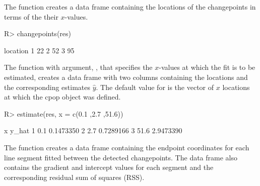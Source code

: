 \documentclass[article]{jss}
\begin{document}
The function 
creates a data frame containing the locations of the changepoints in terms of the their $x$-values.
\begin{CodeChunk}
\begin{CodeInput}
R> changepoints(res)
\end{CodeInput}
\begin{CodeOutput}
  location
1       22
2       52
3       95
\end{CodeOutput}
\end{CodeChunk}
%
%
%
%
The function  with argument,
 , that specifies the $x$-values at which the fit is to be estimated, creates a data frame with two columns containing the locations  and the corresponding estimates $\hat{y}$. The default value for  is the vector of $x$ locations at which the cpop object was defined.
\begin{CodeChunk}
\begin{CodeInput}
R> estimate(res, x = c(0.1 ,2.7 ,51.6))
\end{CodeInput}
\begin{CodeOutput}
   x     y_hat
1  0.1 0.1473350
2  2.7 0.7289166
3 51.6 2.9473390
\end{CodeOutput}
\end{CodeChunk}
%
%
The function  creates a data frame containing the endpoint coordinates for each line segment fitted between the detected
changepoints. The data frame also contains the gradient and intercept values for each segment and the corresponding residual sum of squares (RSS).
\end{document}
